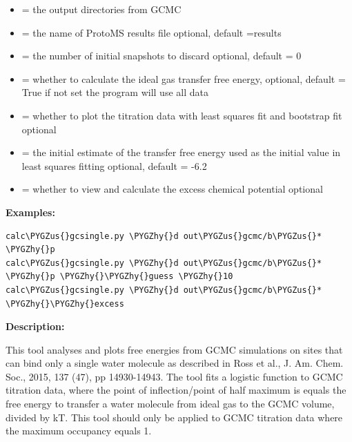 \documentclass[letterpaper,10pt,english]{sphinxmanual}
\def\PYGZus{\char`\_}
\def\PYGZhy{\char`\-}
\begin{document}
\begin{itemize}
\item {} 
 = the output directories from GCMC

\item {} 
 = the name of ProtoMS results file
optional, default =results

\item {} 
 = the number of initial snapshots to discard
optional, default = 0

\item {} 
 = whether to calculate the ideal gas transfer free energy,
optional, default = True
if not set the program will use all data

\item {} 
 = whether to plot the titration data with least squares fit and bootstrap fit
optional

\item {} 
 = the initial estimate of the transfer free energy used as the initial value in least squares fitting
optional, default = -6.2

\item {} 
 = whether to view and calculate the excess chemical potential
optional

\end{itemize}

\textbf{Examples:}

\begin{Verbatim}[commandchars=\\\{\}]
calc\PYGZus{}gcsingle.py \PYGZhy{}d out\PYGZus{}gcmc/b\PYGZus{}* \PYGZhy{}p
calc\PYGZus{}gcsingle.py \PYGZhy{}d out\PYGZus{}gcmc/b\PYGZus{}* \PYGZhy{}p \PYGZhy{}\PYGZhy{}guess \PYGZhy{}10
calc\PYGZus{}gcsingle.py \PYGZhy{}d out\PYGZus{}gcmc/b\PYGZus{}* \PYGZhy{}\PYGZhy{}excess
\end{Verbatim}

\textbf{Description:}

This tool analyses and plots free energies from GCMC simulations on sites that can bind only a single water molecule as described in Ross et al., J. Am. Chem. Soc., 2015, 137 (47), pp 14930-14943. The tool fits a logistic function to GCMC titration data, where the point of inflection/point of half maximum is equals the free energy to transfer a water molecule from ideal gas to the GCMC volume, divided by kT. This tool should only be applied to GCMC titration data where the maximum occupancy equals 1.
\end{document}
